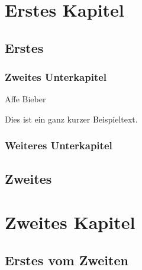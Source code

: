 \chapter{Erstes Kapitel}                %
\section{Erstes}                        %
\subsection{Zweites Unterkapitel}       %

Affe
Bieber

Dies ist ein ganz kurzer Beispieltext\cite{Goossens1994}.

\subsection{Weiteres Unterkapitel}       %
\section{Zweites}
\newpage
\chapter{Zweites Kapitel}
\section{Erstes vom Zweiten}